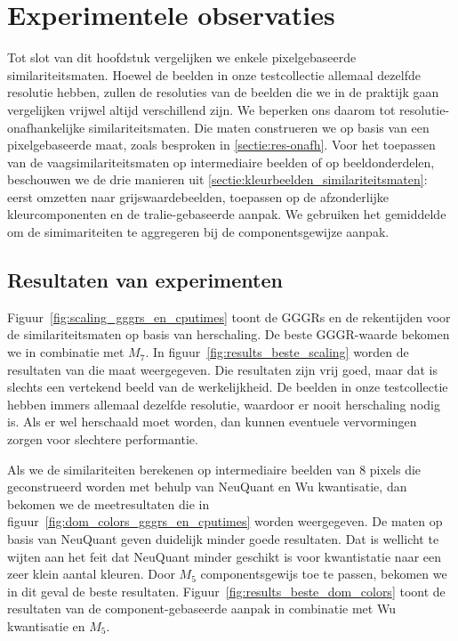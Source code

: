 \section{Experimentele observaties}

Tot slot van dit hoofdstuk vergelijken we enkele pixelgebaseerde similariteitsmaten.
Hoewel de beelden in onze testcollectie allemaal dezelfde resolutie hebben, zullen de
resoluties van de beelden die we in de praktijk gaan vergelijken vrijwel altijd verschillend zijn.
We beperken ons daarom tot resolutie-onafhankelijke similariteitsmaten. Die maten construeren
we op basis van een pixelgebaseerde maat, zoals besproken in \ref{sectie:res-onafh}. 
Voor het toepassen van de vaagsimilariteitsmaten op
intermediaire beelden of op beeldonderdelen, beschouwen we de drie manieren uit \ref{sectie:kleurbeelden_similariteitsmaten}:
eerst omzetten naar grijswaardebeelden, 
toepassen op de afzonderlijke kleurcomponenten en 
de tralie-gebaseerde aanpak. We gebruiken het gemiddelde om de simimariteiten te aggregeren
bij de componentsgewijze aanpak.

\subsection{Resultaten van experimenten}

Figuur~\ref{fig:scaling_gggrs_en_cputimes} toont de GGGRs en de rekentijden voor de 
similariteitsmaten op basis van herschaling. De beste GGGR-waarde bekomen we in combinatie
met $M_7$. In figuur~\ref{fig:results_beste_scaling} worden de resultaten van die maat
weergegeven. Die resultaten zijn vrij goed, maar dat is slechts een vertekend beeld van de
werkelijkheid. De beelden in onze testcollectie hebben immers allemaal dezelfde resolutie,
waardoor er nooit herschaling nodig is. Als er wel herschaald moet worden, dan kunnen
eventuele vervormingen zorgen voor slechtere performantie. 

Als we de similariteiten berekenen op intermediaire beelden van 8 pixels die 
geconstrueerd worden met behulp van NeuQuant en Wu kwantisatie, dan bekomen we
de meetresultaten die in figuur~\ref{fig:dom_colors_gggrs_en_cputimes} worden weergegeven.
De maten op basis van NeuQuant geven duidelijk minder goede resultaten. Dat is wellicht te wijten
aan het feit dat NeuQuant minder geschikt is voor kwantistatie naar een zeer klein aantal 
kleuren. Door $M_5$ componentsgewijs toe te passen, bekomen we in dit geval de beste resultaten. 
Figuur~\ref{fig:results_beste_dom_colors} toont de resultaten van de component-gebaseerde aanpak
in combinatie met Wu kwantisatie en $M_5$.

